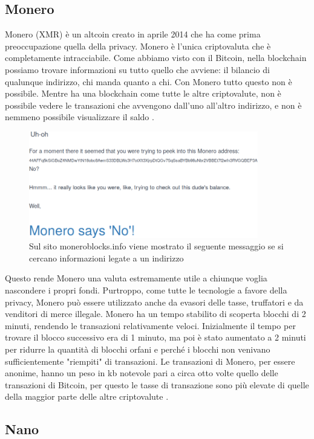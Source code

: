 \documentclass {article}
\begin{document}
\subsection {Monero}


Monero (XMR) è un altcoin creato in aprile 2014 che ha come prima preoccupazione quella della privacy.
Monero è l'unica criptovaluta che è completamente intracciabile. Come abbiamo visto con il Bitcoin, nella blockchain possiamo trovare informazioni su tutto quello che avviene: il bilancio di qualunque indirizzo, chi manda quanto a chi.
Con Monero tutto questo non è possibile. Mentre ha una blockchain come tutte le altre criptovalute, non è possibile vedere le transazioni che avvengono dall'uno all'altro indirizzo, e non è nemmeno possibile visualizzare il saldo \cite{monero}.

\vspace {0.5cm}
\begin{figure}[htb!]
\includegraphics [width = 10cm] {monero.png}
\centering
\caption {Sul sito moneroblocks.info viene mostrato il seguente messaggio se si cercano informazioni legate a un indirizzo}
\end{figure}
\vspace {0.2cm}
\noindent
%
Questo rende Monero una valuta estremamente utile a chiunque voglia nascondere i propri fondi.
Purtroppo, come tutte le tecnologie a favore della privacy, Monero può essere utilizzato anche da evasori delle tasse, truffatori e da venditori di merce illegale.
Monero ha un tempo stabilito di scoperta blocchi di 2 minuti, rendendo le transazioni relativamente veloci.
Inizialmente il tempo per trovare il blocco successivo era di 1 minuto, ma poi è stato aumentato a 2 minuti per ridurre la quantità di blocchi orfani e perché i blocchi non venivano sufficientemente "riempiti" di transazioni.
Le transazioni di Monero, per essere anonime, hanno un peso in kb notevole pari a circa otto volte quello delle transazioni di Bitcoin, per questo le tasse di transazione sono più elevate di quelle della maggior parte delle altre criptovalute \cite{xmrfees}.


\subsection {Nano}
\end{document}
